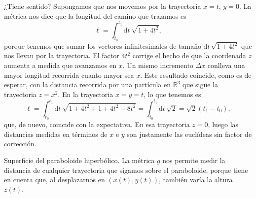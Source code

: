 \begin{example}
    ¿Tiene sentido? Supongamos que nos movemos por la trayectoria \(x=t\), \(y = 0\). La métrica nos dice que la longitud del camino que trazamos es 
    \begin{equation*}
        \ell = \int_{t_0}^{t_1}\mathrm{d}t\,\sqrt{1+4t^2},
    \end{equation*} 
    porque tenemos que sumar los vectores infinitesimales de tamaño \(\mathrm{d}t\,\sqrt{1+4t^2}\) que nos llevan por la trayectoria. El factor \(4t^2\) corrige el hecho de que la coordenada \(z\) aumenta a medida que avanzamos en \(x\). Un mismo incremento \(\Delta x\) conlleva una mayor longitud recorrida cuanto mayor sea \(x\). Este resultado coincide, como es de esperar, con la distancia recorrida por una partícula en \(\mathbb{R}^3\) que sigue la trayectoria \(z = x^2\). En la trayectoria \(x = y = t\), lo que tenemos es 
    \begin{equation*}
        \ell = \int_{t_0}^{t_1}\mathrm{d}t\,\sqrt{1+4t^2 + 1+4t^2 -8t^2} = \int_{t_0}^{t_1}\mathrm{d}t\,\sqrt{2} = \sqrt{2}(t_1-t_0),
    \end{equation*} 
    que, de nuevo, coincide con la expectativa. En esa trayectoria \(z = 0\), luego las distancias medidas en términos de \(x\) e \(y\) son justamente las euclídeas sin factor de corrección.

    \begin{figbox}
        {Superficie del paraboloide hiperbólico. La métrica \(g\) nos permite medir la distancia de cualquier trayectoria que sigamos sobre el paraboloide, porque tiene en cuenta que, al desplazarnos en \((x(t), y(t))\), también varía la altura \(z(t)\).
        \label{fig.3-paraboloide_metrica}}
        
    \end{figbox}
  
\end{example}

